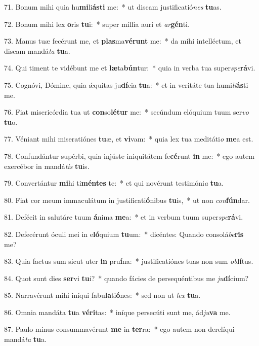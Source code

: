 71. Bonum mihi quia hu\textbf{mi}li\textbf{ás}\textbf{ti} me:~*  ut discam justificatió\textit{nes} \textbf{tu}as.\

72. Bonum mihi lex \textbf{o}ris \textbf{tu}i:~*  super míllia auri et \textit{ar}\textbf{gén}ti.\

73. Manus tuæ fecérunt me, et \textbf{plas}ma\textbf{vé}\textbf{runt} me:~*  da mihi intelléctum, et discam mandá\textit{ta} \textbf{tu}a.\

74. Qui timent te vidébunt me et \textbf{læ}ta\textbf{bún}tur:~*  quia in verba tua super\textit{spe}\textbf{rá}vi.\

75. Cognóvi, Dómine, quia ǽquitas ju\textbf{dí}cia \textbf{tu}a:~*  et in veritáte tua humi\textit{li}\textbf{ás}ti me.\

76. Fiat misericórdia tua ut \textbf{con}so\textbf{lé}\textbf{tur} me:~*  secúndum elóquium tuum ser\textit{vo} \textbf{tu}o.\

77. Véniant mihi miseratiónes \textbf{tu}æ, et \textbf{vi}vam:~*  quia lex tua meditáti\textit{o} \textbf{me}a est.\

78. Confundántur supérbi, quia injúste iniquitátem fe\textbf{cé}runt \textbf{in} me:~*  ego autem exercébor in mandá\textit{tis} \textbf{tu}is.\

79. Convertántur \textbf{mi}hi ti\textbf{mén}\textbf{tes} te:~*  et qui novérunt testimóni\textit{a} \textbf{tu}a.\

80. Fiat cor meum immaculátum in justificati\textbf{ó}nibus \textbf{tu}is,~*  ut non \textit{con}\textbf{fún}dar.\

81. Defécit in salutáre tuum \textbf{á}nima \textbf{me}a:~*  et in verbum tuum super\textit{spe}\textbf{rá}vi.\

82. Defecérunt óculi mei in e\textbf{ló}quium \textbf{tu}um:~*  dicéntes: Quando consolá\textit{be}\textbf{ris} me?\

83. Quia factus sum sicut uter \textbf{in} pru\textbf{í}na:~*  justificatiónes tuas non sum \textit{ob}\textbf{lí}tus.\

84. Quot sunt dies \textbf{ser}vi \textbf{tu}i?~*  quando fácies de persequéntibus me \textit{ju}\textbf{dí}cium?\

85. Narravérunt mihi iníqui fabu\textbf{la}ti\textbf{ó}nes:~*  sed non ut \textit{lex} \textbf{tu}a.\

86. Omnia mandáta \textbf{tu}a \textbf{vé}\textbf{ri}tas:~*  iníque persecúti sunt me, ád\textit{ju}\textbf{va} me.\

87. Paulo minus consummavérunt \textbf{me} in \textbf{ter}ra:~*  ego autem non derelíqui mandá\textit{ta} \textbf{tu}a.\


